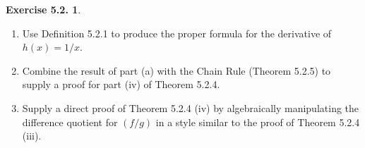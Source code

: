 \documentclass[12pt]{article}
\theoremstyle{definition}
\theoremstyle{exercise}
\newtheorem{exercise}{Exercise 5.2.}
\theoremstyle{solution}
\begin{document}
\begin{exercise}
\label{ex:3}
    \begin{enumerate}
        \item Use Definition 5.2.1 to produce the proper formula for the derivative of \( h(x) = 1/x \).

        \item Combine the result of part (a) with the Chain Rule (Theorem 5.2.5) to supply a proof for part (iv) of Theorem 5.2.4.

        \item Supply a direct proof of Theorem 5.2.4 (iv) by algebraically manipulating the difference quotient for \( (f/g) \) in a style similar to the proof of Theorem 5.2.4 (iii).
    \end{enumerate}
\end{exercise}
\end{document}
